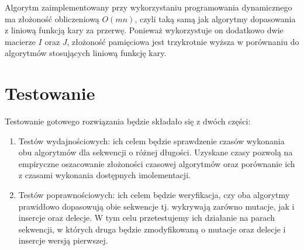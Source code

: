 \documentclass[a4paper,10pt]{article}
\begin{document}
	
	Algorytm zaimplementowany przy wykorzystaniu programowania dynamicznego ma złożoność obliczeniową $O(mn)$, czyli taką samą jak algorytmy dopasowania z liniową funkcją kary za przerwę. Ponieważ wykorzystuje on dodatkowo dwie macierze $I$ oraz $J$, złożoność pamięciowa jest trzykrotnie wyższa w porównaniu do algorytmów stosujących liniową funkcję kary.
	\section{Testowanie}

	Testowanie gotowego rozwiązania będzie składało się z dwóch części:
	\begin{enumerate}
		\item Testów wydajnościowych: ich celem będzie sprawdzenie czasów wykonania obu algorytmów dla sekwencji o różnej długości. Uzyskane czasy pozwolą na empiryczne oszacowanie złożoności czasowej algorytmów oraz porównanie ich z czasami wykonania dostępnych imolementacji.
		\item Testów poprawnościowych: ich celem będzie weryfikacja, czy oba algorytmy prawidłowo dopasowują obie sekwencje tj. wykrywają zarówno mutacje, jak i insercje oraz delecje. W tym celu przetestujemy ich działanie na parach sekwencji, w których druga będzie zmodyfikowaną o mutacje oraz delecje i insercje wersją pierwszej.
	\end{enumerate}
\end{document}
